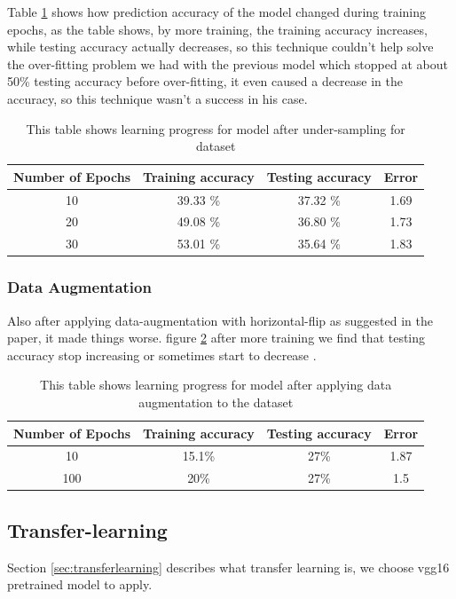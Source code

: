 Table \ref{tab:table1} shows how prediction accuracy of the model changed during training epochs, as the table shows, by more training, the training accuracy increases, while testing accuracy actually decreases, so this technique couldn't help solve the over-fitting problem we had with the previous model which stopped at about 50\% testing accuracy before over-fitting, it even caused a decrease in the accuracy, so this technique wasn't a success in his case. 
\begin{table}[h!]
	\centering
	\caption{This table shows learning progress for model after under-sampling for dataset}
	\label{tab:table1}
	\begin{tabular}{c | c | c | c}
		\textbf{Number of Epochs} & \textbf{Training accuracy} & \textbf{Testing accuracy} & \textbf{Error}\\ \hline 
		10 & 39.33 \% & 37.32 \% & 1.69 \\
		20 & 49.08 \% & 36.80 \% & 1.73 \\
		30 & 53.01 \% & 35.64 \% & 1.83 \\
	\end{tabular}
\end{table}

\subsubsection{Data Augmentation}
Also after applying data-augmentation with horizontal-flip as suggested in the paper\cite{state_of_art}, it made things worse.\newline
figure \ref{tab:table12} after more training we find that testing accuracy stop increasing or sometimes start to decrease .
\begin{table}[h!]
	\centering
	\caption{This table shows learning progress for model after applying data augmentation to the dataset}
	\label{tab:table12}
	\begin{tabular}{c | c | c | c}
		\textbf{Number of Epochs} & \textbf{Training accuracy} & \textbf{Testing accuracy} & \textbf{Error}\\ \hline 
		10 & 15.1\% & 27\% & 1.87 \\
		100 & 20\% &  27\% & 1.5 \\
	\end{tabular}
\end{table}

\subsection{Transfer-learning}
Section \ref{sec:transferlearning} describes what transfer learning is, we choose vgg16 pretrained model to apply.


